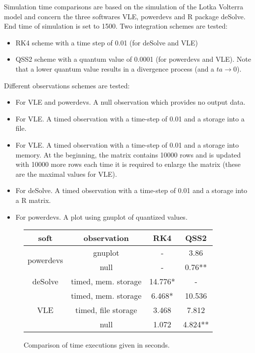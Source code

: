 \documentclass{article}
\theoremstyle{remark}
\begin{document}
Simulation time comparisons are based on the simulation of the Lotka Volterra
model and concern the three softwares VLE, powerdevs and R package deSolve. 
End time of simulation is set to 1500.
Two integration schemes are tested:
\begin{itemize}
  \item RK4 scheme with a time step of 0.01 (for deSolve and VLE)
  \item QSS2 scheme with a quantum value of 0.0001 (for powerdevs and VLE). Note
  that a lower quantum value results in a divergence process (and a $ta \to
  0$).
\end{itemize}
Different observations schemes are tested:
\begin{itemize}
  \item For VLE and powerdevs. A null observation which provides no output
  data.
  \item For VLE. A timed observation with a time-step of 0.01 and a 
  storage into a file.
  \item For VLE. A timed observation with a time-step of 0.01 and a 
  storage into memory. At the beginning, the matrix contains 
  10000 rows and is updated with 10000 more rows each time it is required to
  enlarge the matrix (these are the maximal values for VLE).
  \item For deSolve. A timed observation with a time-step of 0.01 and a 
  storage into a R matrix.
  \item For powerdevs. A plot using gnuplot of quantized values.
\end{itemize}


\begin{figure}
\begin{center}
\begin{tabular}{|c|c|c|c|}
\hline
soft                      & observation         & RK4     & QSS2  \\\hline\hline
\multirow{2}{*}{powerdevs}& gnuplot             &  -      & 3.86  \\ \cline{2-4}
                          & null                &  -      & 0.76**  \\ \hline
deSolve                   & timed, mem. storage &  14.776* & -     \\ \hline
\multirow{3}{*}{VLE}      & timed, mem. storage &  6.468*  & 10.536\\\cline{2-4} 
                          & timed, file storage &  3.468  & 7.812 \\ \cline{2-4}
                          & null                &  1.072  & 4.824** \\ \hline
\end{tabular}
\caption{Comparison of time executions given in seconds.}
\end{center}
\end{figure}
\end{document}
